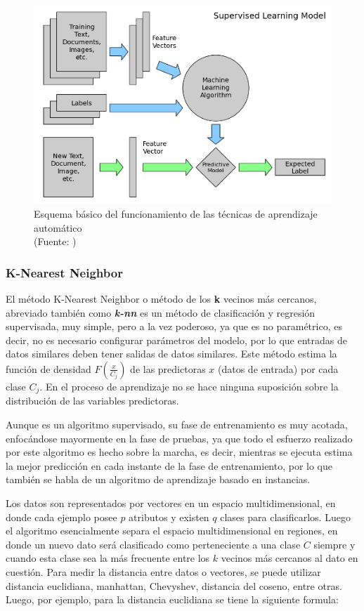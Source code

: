 \begin{figure}[ht!]
\centering
\includegraphics[width=.6\textwidth]{figures/image_machinelearning.png}
\caption[Esquema básico machine learning]{Esquema básico del funcionamiento de las técnicas de aprendizaje automático\\
{\scriptsize (Fuente: \cite{machineLearningBasic})}}
\label{fig:machineLearningBasic}
\end{figure}

\subsubsection{K-Nearest Neighbor}

El método K-Nearest Neighbor o método de los \textbf{k} vecinos más cercanos, abreviado también como \textbf{\textit{k-nn}} es un método de clasificación y regresión supervisada, muy simple, pero a la vez poderoso, ya que es no paramétrico, es decir, no es necesario configurar parámetros del modelo, por lo que entradas de datos similares deben tener salidas de datos similares. Este método estima la función de densidad $F(\frac{x}{C_{j}})$ de las predictoras $x$ (datos de entrada) por cada clase $C_{j}$. En el proceso de aprendizaje no se hace ninguna suposición sobre la distribución de las variables predictoras.

Aunque es un algoritmo supervisado, su fase de entrenamiento es muy acotada, enfocándose mayormente en la fase de pruebas, ya que todo el esfuerzo realizado por este algoritmo es hecho sobre la marcha, es decir, mientras se ejecuta estima la mejor predicción en cada instante de la fase de entrenamiento, por lo que también se habla de un algoritmo de aprendizaje basado en instancias.

Los datos son representados por vectores en un espacio multidimensional, en donde cada ejemplo posee $p$ atributos y existen $q$ clases para clasificarlos. Luego el algoritmo esencialmente separa el espacio multidimensional en regiones, en donde un nuevo dato será clasificado como perteneciente a una clase $C$ siempre y cuando esta clase sea la más frecuente entre los $k$ vecinos más cercanos al dato en cuestión. Para medir la distancia entre datos o vectores, se puede utilizar distancia euclidiana, manhattan, Chevyshev, distancia del coseno, entre otras. Luego, por ejemplo, para la distancia euclidiana se tiene la siguiente formula:

